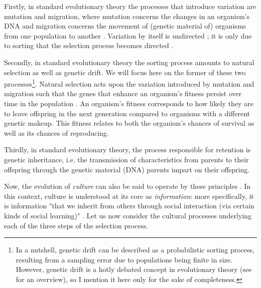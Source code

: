 Firstly, in standard evolutionary theory the processes that introduce variation are mutation and migration, where mutation concerns the changes in an organism's DNA and migration concerns the movement of (genetic material of) organisms from one population to another \citep{S-P13}.
Variation by itself is undirected ; it is only due to sorting that the selection process becomes directed \citep{Donahoe03}.

Secondly, in standard evolutionary theory the sorting process amounts to natural selection as well as genetic drift. We will focus here on the former of these two processes\footnote{In a nutshell, genetic drift can be described as a probabilistic sorting process, resulting from a sampling error due to populations being finite in size. However, genetic drift is a hotly debated concept in evolutionary theory (see \citet{Millstein21} for an overview), so I mention it here only for the sake of completeness.}.
Natural selection 
acts upon the variation introduced by mutation and migration such that the genes that enhance an organism's fitness persist over time in the population \citep{S-P13}. An organism's fitness corresponds to how likely they are to leave offspring in the next generation compared to organisms with a different genetic makeup. This fitness relates to both the organism's chances of survival as well as its chances of reproducing.

Thirdly, in standard evolutionary theory, the process responsible for retention is genetic inheritance, i.e. the transmission of characteristics from parents to their offspring through the genetic material (DNA) parents impart on their offspring.

Now, the evolution of \emph{culture} can also be said to operate by these principles \citep{Heyes18}. In this context, culture is understood at its core as \emph{information}: more specifically, it is information "that we inherit from others through social interaction (via certain kinds of social learning)" \citep[p.~30]{Heyes18}.
Let us now consider the cultural processes underlying each of the three steps of the selection process.

